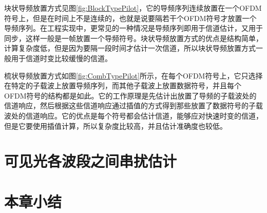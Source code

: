 块状导频放置方式见图\ref{fig:BlockTypePilot}，它的导频序列连续放置在一个OFDM符号上，但是在时间上不是连续的，也就是说要隔若干个OFDM符号才放置一个导频序列。在工程实现中，更常见的一种情况是导频序列即用于信道估计，又用于同步，这样一般是一帧放置一个导频符号。块状导频放置方式的优点是结构简单，计算复杂度低，但是因为要隔一段时间才估计一次信道，所以块状导频放置方式一般用于信道时变比较缓慢的信道。

梳状导频放置方式如图\ref{fig:CombTypePilot}所示，在每个OFDM符号上，它只选择在特定的子载波上放置导频序列，而其他子载波上放置数据符号，并且每个OFDM符号的结构都是如此。它的工作原理是先估计出放置了导频的子载波处的信道响应，然后根据这些信道响应通过插值的方式得到那些放置了数据符号的子载波处的信道响应。它的优点是每个符号都会估计信道，能够应对快速时变的信道，但是它要使用插值计算，所以复杂度比较高，并且估计准确度也较低。
\section{可见光各波段之间串扰估计}
\section{本章小结}
